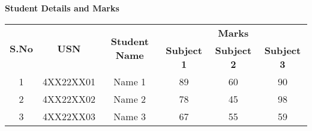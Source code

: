 \documentclass{article}
\begin{document}
\centering
\textbf{\Large Student Details and Marks} %
\vspace{0.3cm}

\begin{table}[h]
\centering
\begin{tabular}{|c|c|c|c|c|c|}
\hline
\multirow{2}{*}{\textbf{S.No}} & \multirow{2}{*}{\textbf{USN}} & 
\multirow{2}{*}{\textbf{Student Name}} & \multicolumn{3}{c|}{\textbf{Marks}} \\
\cline{4-6}
 &  &  & \textbf{Subject 1} & \textbf{Subject 2} & \textbf{Subject 3} \\
\hline
1 & 4XX22XX01 & Name 1 & 89 & 60 & 90 \\
\hline
2 & 4XX22XX02 & Name 2 & 78 & 45 & 98 \\
\hline
3 & 4XX22XX03 & Name 3 & 67 & 55 & 59 \\
\hline
\end{tabular}
\end{table}
\end{document}
